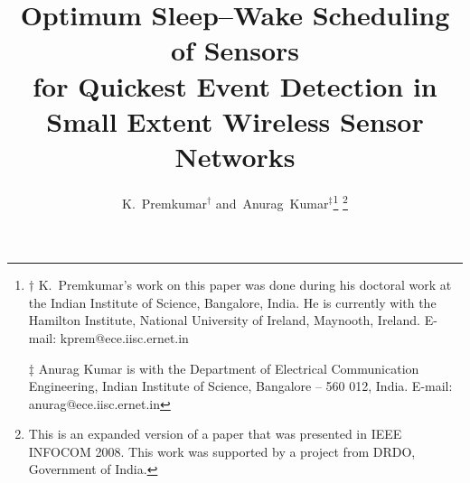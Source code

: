 \documentclass[journal]{IEEEtran}
\begin{document}
\title{Optimum Sleep--Wake Scheduling of Sensors\\ 
       for Quickest Event Detection	in\\
	   Small Extent Wireless Sensor Networks}


\author{K.~Premkumar$^\dagger$ and~Anurag~Kumar$^\ddagger$\thanks{$\dagger$ K.~Premkumar's work on this paper was done during
	his doctoral work at the Indian Institute of Science, Bangalore, 
	India. He is currently with the Hamilton Institute, National
	University of Ireland, Maynooth, Ireland.
	E-mail: kprem@ece.iisc.ernet.in
	
	$\ddagger$ Anurag Kumar is with the Department of Electrical
	Communication Engineering, Indian Institute of Science, Bangalore --
	560 012, India. 
	E-mail: anurag@ece.iisc.ernet.in }
    \thanks{This is an expanded version of a paper that was presented in IEEE
	INFOCOM 2008. This work was supported by a project from DRDO, Government of India.}
}



















\maketitle
\end{document}
